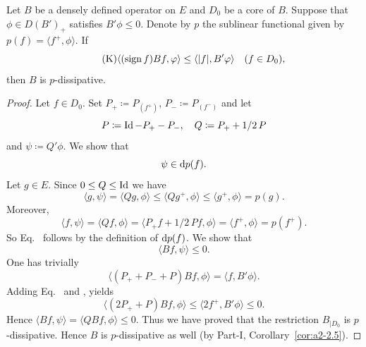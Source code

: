 \begin{proposition}\label{prop:c2-3.10}
Let $B$ be a densely defined operator on $E$ and $D_{0}$ be a core of\/ $B$.
Suppose that $\phi \in D(B')_{+}$ satisfies $B'\phi \leq 0$.
Denote by $p$ the sublinear functional given by $p(f) = \langle f^{+},\phi \rangle$. 
If
\begin{equation*}\label{eq:c2-K6} \tag{K}
	\langle(\sign f) Bf,\phi \rangle \leq \langle|f|,B'\phi\rangle \quad (f \in D_{0}),
\end{equation*}
then $B$ is $p$-dissipative.
\end{proposition}
\begin{proof}
Let $f \in D_{0}$. 
Set $P_{+} \coloneq P_{(f^{+})}$, $P_{-} \coloneq P_{(f^{-})}$ and let
\[
P \coloneq \operatorname{Id} - P_{+} - P_{-} , \quad Q \coloneq P_{+} + 1/2\,P
\]
and $\psi \coloneq Q'\phi$. We show that
\begin{equation}\label{eq:c2-3.2}
\psi \in \mathop{}\!\mathrm{d}{p}(f).
\end{equation}
Let $g \in E$. 
Since $0 \leq Q \leq \Id$ we have 
\[
\langle g,\psi \rangle = \langle Qg,\phi \rangle \leq \langle Qg^{+},\phi \rangle \leq
\langle g^{+},\phi \rangle = p(g) .
\]
Moreover, 
\[\langle f, \psi \rangle = \langle Qf,\phi \rangle = \langle P_{+}f + 1/2 \, Pf,\phi \rangle = \langle f^{+},\phi \rangle = p(f^{+}) .
\]
So Eq.~ follows by the definition of\/ $\mathop{}\!\mathrm{d}{p}(f)$. 
We show that
\begin{equation}\label{eq:c2-3.3}
\langle Bf,\psi \rangle \leq 0.
\end{equation}
One has trivially
\begin{equation}\label{eq:c2-3.4}
\langle(P_{+} + P_{-} + P) Bf,\phi \rangle = \langle f,B'\phi \rangle.
\end{equation}
Adding Eq.~ and ,  yields
\[
\langle(2P_{+} + P)Bf,\phi \rangle \leq \langle 2f^{+},B'\phi \rangle \leq 0 .
\]
Hence $\langle Bf,\psi \rangle = \langle QBf,\phi \rangle \leq 0$.
Thus we have proved that the restriction  $B_{|D_{0}}$ is $p$-dissipative. 
Hence $B$ is $p$-dissipative as well (by Part-I, Corollary~\ref{cor:a2-2.5}).
\end{proof}
